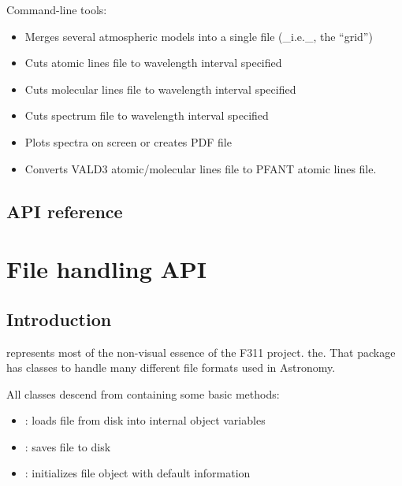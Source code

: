 \documentclass[letterpaper,10pt,english]{sphinxmanual}
\begin{document}
Command-line tools:
\begin{itemize}
\item {} 
 \textendash{} Merges several atmospheric models into a single file (\_i.e.\_, the “grid”)

\item {} 
 \textendash{} Cuts atomic lines file to wavelength interval specified

\item {} 
 \textendash{} Cuts molecular lines file to wavelength interval specified

\item {} 
 \textendash{} Cuts spectrum file to wavelength interval specified

\item {} 
 \textendash{} Plots spectra on screen or creates PDF file

\item {} 
 \textendash{} Converts VALD3 atomic/molecular lines file to PFANT atomic lines file.

\end{itemize}


\section{API reference}
\label{\detokenize{explorer:api-reference}}


\chapter{File handling API}
\label{\detokenize{filetypes::doc}}\label{\detokenize{filetypes:file-handling-api}}

\section{Introduction}
\label{\detokenize{filetypes:introduction}}
 represents most of the non-visual essence of the F311 project.
the. That package has classes to handle many different file formats used in Astronomy.

All classes descend from  containing some basic methods:
\begin{itemize}
\item {} 
: loads file from disk into internal object variables

\item {} 
: saves file to disk

\item {} 
: initializes file object with default information

\end{itemize}
\end{document}
